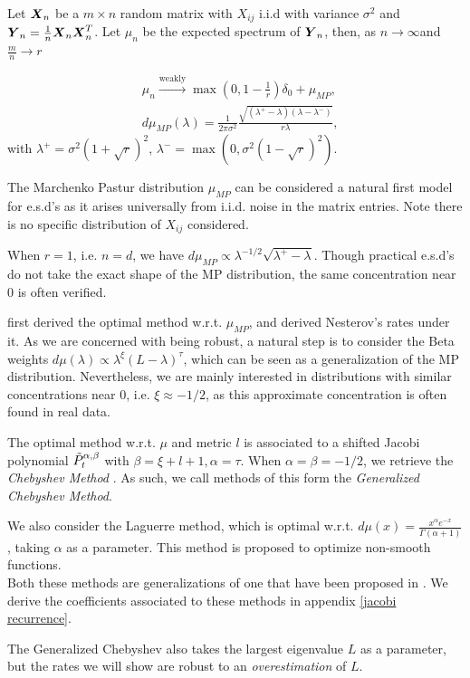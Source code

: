 \documentclass{article}
\begin{document}
\begin{prop}
Let ${\boldsymbol X}_n$ be a $m\times n$ random matrix with $X_{ij}$ i.i.d with variance $\sigma^2$ and ${\boldsymbol Y}_n=\frac{1}{n}{\boldsymbol X}_n{\boldsymbol X}_n^T$. Let $\mu_n$ be the expected spectrum of ${\boldsymbol Y}_n$, then, as $n\rightarrow\infty$and  $\frac{m}{n} \rightarrow r$

\begin{align*}
&\mu_n\xrightarrow{\text{weakly}}{}\max(0,1-\frac{1}{r})\delta_0+\mu_{MP}, \\
&d\mu_{MP}(\lambda)=\frac{1}{2\pi\sigma^2}\frac{\sqrt{(\lambda^+-\lambda)(\lambda-\lambda^-)}}{r\lambda} ,
\end{align*}
with $\lambda^+=\sigma^2(1+\sqrt{r})^2$, $\lambda^-=\max(0,\sigma^2(1-\sqrt{r})^2)$.

\end{prop}
The Marchenko Pastur distribution $\mu_{MP}$ can be considered a natural first model for e.s.d's as it arises universally from i.i.d. noise in the matrix entries. Note there is no specific distribution of $X_{ij}$ considered. 


When $r=1$, i.e. $n=d$, we have $d\mu_{MP}\propto \lambda^{-1/2}\sqrt{\lambda^+-\lambda}$. Though practical e.s.d's do not take the exact shape of the MP distribution, the same concentration near $0$ is often verified.


\cite{pedregosa2020acceleration} first derived the optimal method w.r.t. $\mu_{MP}$, and \cite{paquette2020halting} derived Nesterov's rates under it. As we are concerned with being robust, a natural step is to consider the Beta weights $d\mu(\lambda)\propto\lambda^\xi(L-\lambda)^\tau$, which can be seen as a generalization of the MP distribution.  Nevertheless, we are mainly interested in distributions with similar concentrations near $0$, i.e. $\xi\approx -1/2$, as this approximate concentration is often found in real data.


The optimal method w.r.t. $\mu$ and metric $l$ is associated to a shifted Jacobi polynomial $\Tilde{P}_t^{\alpha,\beta}$ with $\beta=\xi+l+1, \alpha=\tau$. When $\alpha=\beta=-1/2$, we retrieve the \textit{Chebyshev Method} \citep{hestenes1952methods}. As such, we call methods of this form the \textit{Generalized Chebyshev Method}. 


We  also consider the Laguerre method, which is optimal w.r.t. $d\mu(x)=\frac{x^\alpha e^{-x}}{\Gamma(\alpha+1)}$, taking $\alpha$ as a parameter. This method is proposed to optimize non-smooth functions.\\
Both these methods are generalizations of one that have been proposed in \cite{pedregosa2020acceleration}. We derive the coefficients associated to these methods in appendix \ref{jacobi recurrence}.\\
\begin{remark}
The Generalized Chebyshev also takes the largest eigenvalue $L$ as a parameter, but the rates we will show are robust to an \textit{overestimation} of $L$.
\end{remark}
\end{document}
